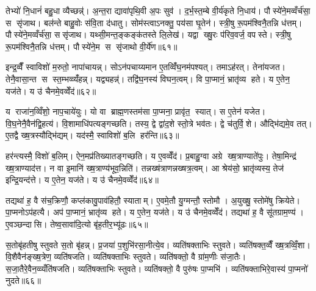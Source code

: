 तेभ्यो॑ नि॒धानं॑ बहु॒धा व्यैच्छन्न्॑। अ॒न्त॒रा द्यावा॑पृथि॒वी अ॒पः सुव॑। द॒र्भ॒स्त॒म्बे वी॒र्य॑कृते नि॒धाय॑। पौस्ये॑ने॒मव्वँर्च॑सा॒ स सृ॑जाथ। बल॑न्ते बाहु॒वोः स॑वि॒ता द॑धातु। सोम॑स्त्वाऽनक्तु॒ पय॑सा घृ॒तेन॑। स्त्री॒षु रू॒पम॑श्विनै॒तन्नि ध॑त्तम्। पौस्ये॑ने॒मव्वँर्च॑सा॒ ससृ॑जाथ। यथ्सी॒मन्त॒ङ्कङ्क॑तस्ते लि॒लेख॑। यद्वा ख्षु॒रः प॑रिव॒वर्ज॒ वपस्ते। स्त्री॒षु रू॒पम॑श्विनै॒तन्नि ध॑त्तम्। पौस्ये॑ने॒म स सृ॑जाथो वी॒र्ये॑ण॥६१॥\anuvakamend[अवास्राग्दी॒ख्षा व॒शिनी॒ ह्यु॑ग्राऽद॑धाद्व॒वर्ज॒ वप स्ते॒ द्वे च॑]

इन्द्र॒व्वैँ स्वाविशो॑ म॒रुतो॒ नापा॑चायन्न्। सोऽन॑पचाय्यमान ए॒तव्विँ॑घ॒नम॑पश्यत्। तमाऽह॑रत्। तेना॑यजत। तेनै॒वासा॒न्त स स्त॒म्भव्व्यँ॑हन्न्। यद्व्यहन्न्॑। तद्वि॑घ॒नस्य॑ विघन॒त्वम्। वि पा॒प्मानं॒ भ्रातृ॑व्य हते। य ए॒तेन॒ यज॑ते। य उ॑ चैनमे॒वव्वेँद॑॥६२॥

य राजा॑न॒व्विँशो॒ नाप॒चाये॑युः। यो वा ब्राह्म॒णस्तम॑सा पा॒प्मना॒ प्रावृ॑त॒ स्यात्। स ए॒तेन॑ यजेत। वि॒घ॒नेनै॒वैन॑द्वि॒हत्य॑। वि॒शामाधि॑पत्यङ्गच्छति। तस्य॒ द्वे द्वा॑द॒शे स्तो॒त्रे भव॑तः। द्वे च॑तुर्वि॒शे। औद्भि॑द्यमे॒व तत्। ए॒तद्वै ख्ष॒त्रस्यौद्भि॑द्यम्। यद॑स्मै॒ स्वाविशो॑ ब॒लि हर॑न्ति॥६३॥

हर॑न्त्यस्मै॒ विशो॑ ब॒लिम्। ऐन॒मप्र॑तिख्यातङ्गच्छति। य ए॒वव्वेँद॑। प्र॒बाहु॒ग्वा अग्रे ख्ष॒त्राण्याते॑पुः। तेषा॒मिन्द्र॑ ख्ष॒त्राण्याद॑त्त। न वा इ॒मानि॑ ख्ष॒त्राण्य॑भूव॒न्निति॑। तन्नख्ष॑त्राणन्नख्षत्र॒त्वम्। आ श्रेय॑सो॒ भ्रातृ॑व्यस्य॒ तेज॑ इन्द्रि॒यन्द॑त्ते। य ए॒तेन॒ यज॑ते। य उ॑ चैनमे॒वव्वेँद॑॥६४॥

तद्यथा॑ ह॒ वै स॑च॒क्रिणौ॒ कप्ल॑कावु॒पाव॑हितौ॒ स्याताम्। ए॒वमे॒तौ यु॒ग्मन्तौ॒ स्तोमौ। अ॒युख्षु॒ स्तोमे॑षु क्रियेते। पा॒प्मनोऽप॑हत्यै। अप॑ पा॒प्मानं॒ भ्रातृ॑व्य हते। य ए॒तेन॒ यज॑ते। य उ॑ चैनमे॒वव्वेँद॑। तद्यथा॑ ह॒ वै सू॑तग्राम॒ण्य॑। ए॒वञ्छन्दासि। तेष्व॒सावा॑दि॒त्यो बृ॑ह॒तीर॒भ्यू॑ढः॥६५॥

स॒तोबृ॑हतीषु स्तुवते स॒तो बृ॑हन्न्। प्र॒जया॑ प॒शुभि॑रसा॒नीत्ये॒व। व्यति॑षक्ताभिः स्तुवते। व्यति॑षक्त॒व्वैँ ख्ष॒त्रव्विँ॒शा। वि॒शैवैन॑ङ्ख्ष॒त्रेण॒ व्यति॑षजति। व्यति॑षक्ताभिः स्तुवते। व्यति॑षक्तो॒ वै ग्रा॑म॒णीः स॑जा॒तैः। स॒जा॒तैरे॒वैन॒व्व्यँति॑षजति। व्यति॑षक्ताभिः स्तुवते। व्यति॑षक्तो॒ वै पुरु॑षः पा॒प्मभि॑। व्यति॑षक्ताभिरे॒वास्य॑ पा॒प्मनो॑ नुदते॥६६॥


